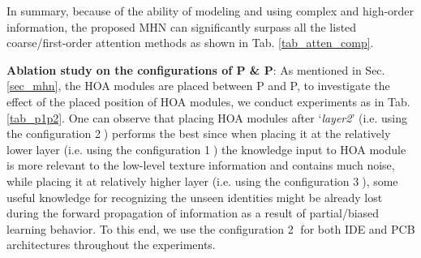 \documentclass[10pt,twocolumn,letterpaper]{article}
\begin{document}
In summary, because of the ability of modeling and using complex and high-order information, the proposed MHN can significantly surpass all the listed coarse/first-order attention methods as shown in Tab. \ref{tab_atten_comp}.

\textbf{Ablation study on the configurations of P \& P}: As mentioned in Sec. \ref{sec_mhn}, the HOA modules are placed between P and P, to investigate the effect of the placed position of HOA modules, we conduct experiments as in Tab. \ref{tab_p1p2}. One can observe that placing HOA modules after `\emph{layer2}' (i.e. using the configuration \textcircled{2}) performs the best since when placing it at the relatively lower layer (i.e. using the configuration \textcircled{1}) the knowledge input to HOA module is more relevant to the low-level texture information and contains much noise, while placing it at relatively higher layer (i.e. using the configuration \textcircled{3}), some useful knowledge for recognizing the unseen identities might be already lost during the forward propagation of information as a result of partial/biased learning behavior. To this end, we use the configuration \textcircled{2} for both IDE and PCB architectures throughout the experiments.
\begin{table}[t!]
  \centering
  \vspace{0.1em}
      \caption{Ablation study on the configurations of P and P. All the layer names are shown in Pytorch manner. Here, for convenience we conduct experiments with MHN- (IDE) and test three configurations, i.e. \textcircled{1},\textcircled{2} and \textcircled{3}.}
      \vspace{-0.5em}
  \label{tab_p1p2}\end{table}
\end{document}
